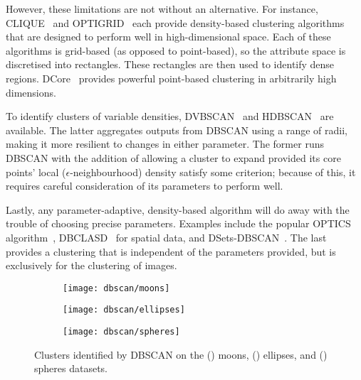 However, these limitations are not without an alternative. For instance,
CLIQUE~\cite{Agrawal1998} and OPTIGRID~\cite{Hinneburg1999} each provide
density-based clustering algorithms that are designed to perform well in
high-dimensional space. Each of these algorithms is grid-based (as opposed to
point-based), so the attribute space is discretised into rectangles. These
rectangles are then used to identify dense regions.
DCore~\cite{Chen2018clustering} provides powerful point-based clustering in
arbitrarily high dimensions.

To identify clusters of variable densities, DVBSCAN~\cite{Ram2010} and
HDBSCAN~\cite{Campello2013} are available. The latter aggregates outputs from
DBSCAN using a range of radii, making it more resilient to changes in either
parameter. The former runs DBSCAN with the addition of allowing a cluster to
expand provided its core points' local (\(\epsilon\)-neighbourhood) density
satisfy some criterion; because of this, it requires careful consideration of
its parameters to perform well.

Lastly, any parameter-adaptive, density-based algorithm will do away with the
trouble of choosing precise parameters. Examples include the popular OPTICS
algorithm~\cite{Ankerst1999}, DBCLASD~\cite{Xu1998} for spatial data, and
DSets-DBSCAN~\cite{Hou2016}. The last provides a clustering that is independent
of the parameters provided, but is exclusively for the clustering of images.

\begin{figure}
    \centering
    \begin{subfigure}{.333\textwidth}
        \texttt{[image: dbscan/moons]}
        \caption{}\label{fig:dbscan_moons}
    \end{subfigure}%
    \hfill%
    \begin{subfigure}{.333\textwidth}
        \texttt{[image: dbscan/ellipses]}
        \caption{}\label{fig:dbscan_ellipses}
    \end{subfigure}%
    \hfill%
    \begin{subfigure}{.333\textwidth}
        \texttt{[image: dbscan/spheres]}
        \caption{}\label{fig:dbscan_spheres}
    \end{subfigure}
    \caption{%
        Clusters identified by DBSCAN on the () moons,
        () ellipses, and
        () spheres datasets.%
    }\label{fig:dbscan_examples}
\end{figure}


